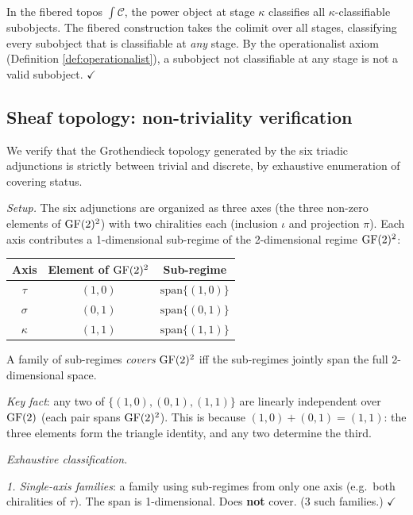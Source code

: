 In the fibered topos $\int \mathcal{C}$, the power
object at stage $\kappa$ classifies all
$\kappa$-classifiable subobjects. The fibered
construction takes the colimit over all stages,
classifying every subobject that is classifiable at
\emph{any} stage. By the operationalist axiom
(Definition \ref{def:operationalist}), a subobject
not classifiable at any stage is not a valid subobject.
$\checkmark$


\subsection{Sheaf topology: non-triviality verification}
\label{app:topology-nontrivial}

We verify that the Grothendieck topology generated by the
six triadic adjunctions is strictly between trivial and
discrete, by exhaustive enumeration of covering status.

\emph{Setup.}
The six adjunctions are organized as three axes (the three
non-zero elements of $\operatorname{GF}(2)^2$) with two chiralities
each (inclusion $\iota$ and projection $\pi$). Each axis
contributes a 1-dimensional sub-regime of the
2-dimensional regime $\operatorname{GF}(2)^2$:
\begin{center}
\begin{tabular}{c|c|c}
Axis & Element of $\operatorname{GF}(2)^2$ & Sub-regime \\
\hline
$\tau$ & $(1,0)$ & $\mathrm{span}\{(1,0)\}$ \\
$\sigma$ & $(0,1)$ & $\mathrm{span}\{(0,1)\}$ \\
$\kappa$ & $(1,1)$ & $\mathrm{span}\{(1,1)\}$
\end{tabular}
\end{center}

A family of sub-regimes \emph{covers} $\operatorname{GF}(2)^2$ iff the
sub-regimes jointly span the full 2-dimensional space.

\emph{Key fact}: any two of $\{(1,0), (0,1), (1,1)\}$
are linearly independent over $\operatorname{GF}(2)$ (each pair spans
$\operatorname{GF}(2)^2$). This is because $(1,0) + (0,1) = (1,1)$:
the three elements form the triangle identity, and any
two determine the third.

\emph{Exhaustive classification.}

\emph{1. Single-axis families}: a family using
sub-regimes from only one axis (e.g.\ both chiralities
of $\tau$). The span is 1-dimensional. Does \textbf{not}
cover. (3 such families.) $\checkmark$


